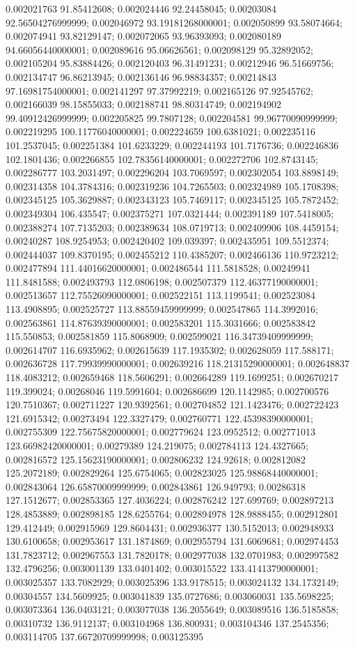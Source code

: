 0.002021763 91.85412608; 0.002024446 92.24458045; 0.00203084 92.56504276999999; 0.002046972 93.19181268000001; 0.002050899 93.58074664; 0.002074941 93.82129147; 0.002072065 93.96393093; 0.002080189 94.66056440000001; 0.002089616 95.06626561; 0.002098129 95.32892052; 0.002105204 95.83884426; 0.002120403 96.31491231; 0.00212946 96.51669756; 0.002134747 96.86213945; 0.002136146 96.98834357; 0.00214843 97.16981754000001; 0.002141297 97.37992219; 0.002165126 97.92545762; 0.002166039 98.15855033; 0.002188741 98.80314749; 0.002194902 99.40912426999999; 0.002205825 99.7807128; 0.002204581 99.96770090999999; 0.002219295 100.11776040000001; 0.002224659 100.6381021; 0.002235116 101.2537045; 0.002251384 101.6233229; 0.002244193 101.7176736; 0.002246836 102.1801436; 0.002266855 102.78356140000001; 0.002272706 102.8743145; 0.002286777 103.2031497; 0.002296204 103.7069597; 0.002302054 103.8898149; 0.002314358 104.3784316; 0.002319236 104.7265503; 0.002324989 105.1708398; 0.002345125 105.3629887; 0.002343123 105.7469117; 0.002345125 105.7872452; 0.002349304 106.435547; 0.002375271 107.0321444; 0.002391189 107.5418005; 0.002388274 107.7135203; 0.002389634 108.0719713; 0.002409906 108.4459154; 0.00240287 108.9254953; 0.002420402 109.039397; 0.002435951 109.5512374; 0.002444037 109.8370195; 0.002455212 110.4385207; 0.002466136 110.9723212; 0.002477894 111.44016620000001; 0.002486544 111.5818528; 0.00249941 111.8481588; 0.002493793 112.0806198; 0.002507379 112.46377190000001; 0.002513657 112.75526090000001; 0.002522151 113.1199541; 0.002523084 113.4908895; 0.002525727 113.88559459999999; 0.002547865 114.3992016; 0.002563861 114.87639390000001; 0.002583201 115.3031666; 0.002583842 115.550853; 0.002581859 115.8068909; 0.002599021 116.34739409999999; 0.002614707 116.6935962; 0.002615639 117.1935302; 0.002628059 117.588171; 0.002636728 117.79939990000001; 0.002639216 118.21315290000001; 0.002648837 118.4083212; 0.002659468 118.5606291; 0.002664289 119.1699251; 0.002670217 119.399024; 0.00268046 119.5991604; 0.002686699 120.1142985; 0.002700576 120.7510367; 0.002711227 120.9392561; 0.002704852 121.1423476; 0.002722423 121.6915342; 0.00273494 122.3327479; 0.002760771 122.45398390000001; 0.002755309 122.75675820000001; 0.002779624 123.0952512; 0.002771013 123.66982420000001; 0.00279389 124.219075; 0.002784113 124.4327665; 0.002816572 125.15623190000001; 0.002806232 124.92618; 0.002812082 125.2072189; 0.002829264 125.6754065; 0.002823025 125.98868440000001; 0.002843064 126.65870009999999; 0.002843861 126.949793; 0.00286318 127.1512677; 0.002853365 127.4036224; 0.002876242 127.699769; 0.002897213 128.4853889; 0.002898185 128.6255764; 0.002894978 128.9888455; 0.002912801 129.412449; 0.002915969 129.8604431; 0.002936377 130.5152013; 0.002948933 130.6100658; 0.002953617 131.1874869; 0.002955794 131.6069681; 0.002974453 131.7823712; 0.002967553 131.7820178; 0.002977038 132.0701983; 0.002997582 132.4796256; 0.003001139 133.0401402; 0.003015522 133.41413790000001; 0.003025357 133.7082929; 0.003025396 133.9178515; 0.003024132 134.1732149; 0.00304557 134.5609925; 0.003041839 135.0727686; 0.003060031 135.5698225; 0.003073364 136.0403121; 0.003077038 136.2055649; 0.003089516 136.5185858; 0.00310732 136.9112137; 0.003104968 136.800931; 0.003104346 137.2545356; 0.003114705 137.66720709999998; 0.003125395 